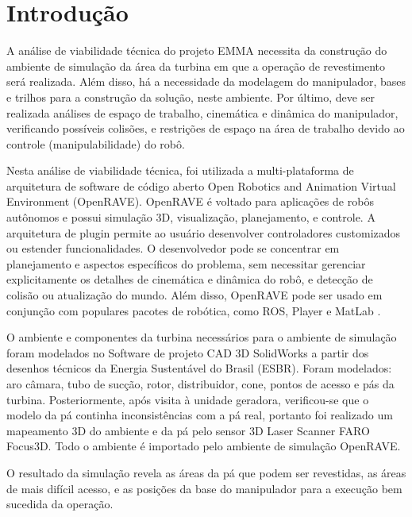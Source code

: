 \section{Introdução}
A análise de viabilidade técnica do projeto EMMA necessita da construção do
ambiente de simulação da área da turbina em que a operação de revestimento será
realizada. Além disso, há a necessidade da modelagem do manipulador, bases e
trilhos para a construção da solução, neste ambiente. Por último, deve ser
realizada análises de espaço de trabalho, cinemática e dinâmica do manipulador,
verificando possíveis colisões, e restrições de espaço na área de trabalho
devido ao controle (manipulabilidade) do robô. 

Nesta análise de viabilidade técnica, foi utilizada a 
multi-plataforma de arquitetura de software de código aberto Open
Robotics and Animation Virtual Environment (OpenRAVE). OpenRAVE é voltado para
aplicações de robôs autônomos e possui simulação 3D, visualização, planejamento,
e controle. A arquitetura de plugin permite ao usuário desenvolver controladores
customizados ou estender funcionalidades. O desenvolvedor pode se
concentrar em planejamento e aspectos específicos do problema, sem necessitar
gerenciar explicitamente os detalhes de cinemática e dinâmica do robô, e
detecção de colisão ou atualização do mundo. Além disso, OpenRAVE pode ser usado
em conjunção com populares pacotes de robótica, como ROS, Player e MatLab
\cite{diankov2008openrave}. 

O ambiente e componentes da turbina necessários para o ambiente de simulação
foram modelados no Software de projeto CAD 3D SolidWorks a partir dos desenhos
técnicos da Energia Sustentável do Brasil (ESBR). Foram modelados: aro câmara,
tubo de sucção, rotor, distribuidor, cone, pontos de acesso e pás da turbina.
Posteriormente, após visita à unidade geradora, verificou-se que o modelo da pá
continha inconsistências com a pá real, portanto foi realizado um mapeamento 3D
do ambiente e da pá pelo sensor 3D Laser Scanner FARO Focus3D. Todo o ambiente é
importado pelo ambiente de simulação OpenRAVE.

O resultado da simulação revela as áreas da pá que podem ser revestidas, as
áreas de mais difícil acesso, e as posições da base do manipulador para a
execução bem sucedida da operação.
